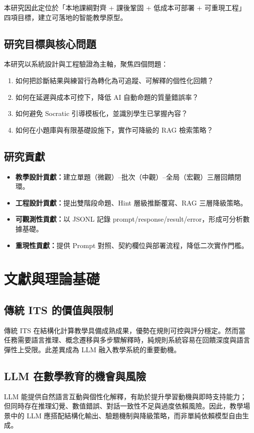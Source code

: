 \documentclass[12pt,a4paper]{article}
\begin{document}
本研究因此定位於「本地課綱對齊 + 課後鞏固 + 低成本可部署 + 可重現工程」四項目標，建立可落地的智能教學原型。

\subsection{研究目標與核心問題}
本研究以系統設計與工程驗證為主軸，聚焦四個問題：
\begin{enumerate}[leftmargin=2em]
  \item 如何把診斷結果與練習行為轉化為可追蹤、可解釋的個性化回饋？
  \item 如何在延遲與成本可控下，降低 AI 自動命題的質量錯誤率？
  \item 如何避免 Socratic 引導模板化，並識別學生已掌握內容？
  \item 如何在小題庫與有限基礎設施下，實作可降級的 RAG 檢索策略？
\end{enumerate}

\subsection{研究貢獻}
\begin{itemize}[leftmargin=2em]
  \item \textbf{教學設計貢獻：}建立單題（微觀）--批次（中觀）--全局（宏觀）三層回饋閉環。
  \item \textbf{工程設計貢獻：}提出雙階段命題、Hint 層級推斷覆寫、RAG 三層降級策略。
  \item \textbf{可觀測性貢獻：}以 JSONL 記錄 prompt/response/result/error，形成可分析數據基礎。
  \item \textbf{重現性貢獻：}提供 Prompt 對照、契約欄位與部署流程，降低二次實作門檻。
\end{itemize}

\section{文獻與理論基礎}
\subsection{傳統 ITS 的價值與限制}
傳統 ITS 在結構化計算教學具備成熟成果，優勢在規則可控與評分穩定。然而當任務需要語言推理、概念遷移與多步驟解釋時，純規則系統容易在回饋深度與語言彈性上受限。此差異成為 LLM 融入教學系統的重要動機。

\subsection{LLM 在數學教育的機會與風險}
LLM 能提供自然語言互動與個性化解釋，有助於提升學習動機與即時支持能力；但同時存在推理幻覺、數值錯誤、對話一致性不足與過度依賴風險。因此，教學場景中的 LLM 應搭配結構化輸出、驗題機制與降級策略，而非單純依賴模型自由生成。
\end{document}
